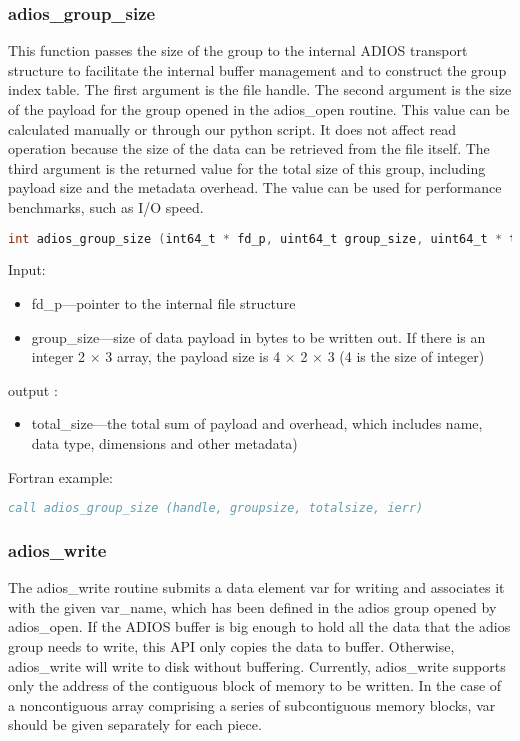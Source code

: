 \subsubsection{adios\_group\_size}
This function passes the size of the group to the internal ADIOS transport structure 
to facilitate the internal buffer management and to construct the group index table. 
The first argument is the file handle. The second argument is the size of the payload 
for the group opened in the adios\_open routine. This value can be calculated manually 
or through our python script. It does not affect read operation because the size 
of the data can be retrieved from the file itself. The third argument is the returned 
value for the total size of this group, including payload size and the metadata 
overhead. The value can be used for performance benchmarks, such as I/O speed. 

\begin{lstlisting}[language=C]
int adios_group_size (int64_t * fd_p, uint64_t group_size, uint64_t * total_size)
\end{lstlisting}

Input: 
\begin{itemize}
\item fd\_p---pointer to the internal file structure
\item group\_size---size of data payload in bytes to be written out. If there is an integer 
2 $\times$ 3 array, the payload size is 4 $\times$ 2 $\times$ 3 (4 is the size of integer)
\end{itemize}

output :
\begin{itemize}
\item total\_size---the total sum of payload and overhead, which includes name, data 
type, dimensions and other metadata)
\end{itemize}

Fortran example: 
\begin{lstlisting}[language=Fortran, caption={}]
call adios_group_size (handle, groupsize, totalsize, ierr)
\end{lstlisting}

\subsubsection{adios\_write}
The adios\_write routine submits a data element var for writing and associates 
it with the given var\_name, which has been defined in the adios group opened by 
adios\_open. If the ADIOS buffer is big enough to hold all the data that the adios 
group needs to write, this API only copies the data to buffer. Otherwise, adios\_write 
will write to disk without buffering. Currently, adios\_write supports only the 
address of the contiguous block of memory to be written. In the case of a noncontiguous 
array comprising a series of subcontiguous memory blocks, var should be given separately 
for each piece.

